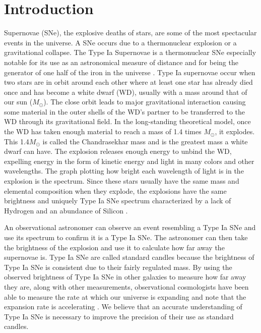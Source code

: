 \documentclass[preprint]{aastex62}
\begin{document}
\pagebreak

\section{Introduction}


  Supernovae (SNe), the explosive deaths of stars, are some of the most spectacular events in the universe. A SNe occurs due to a thermonuclear explosion or a gravitational collapse. The Type Ia Supernovae is a thermonuclear SNe especially notable for its use as an astronomical measure of distance and for being the generator of one half of the iron in the universe \citep{ironhalfuniverse}. Type Ia supernovae occur when two stars are in orbit around each other where at least one star has already died once and has become a white dwarf (WD), usually with a mass around that of our sun ($M_{\odot}$). The close orbit leads to major gravitational interaction causing some material in the outer shells of the WD's partner to be transferred to the WD through its gravitational field. In the long-standing theoretical model, once the WD has taken enough material to reach a mass of 1.4 times $M_{\odot}$, it explodes. This 1.4$M_{\odot}$ is called the Chandrasekhar mass and is the greatest mass a white dwarf can have. The explosion releases enough energy to unbind the WD, expelling energy in the form of kinetic energy and light in many colors and other wavelengths. The graph plotting how bright each wavelength of light is in the explosion is the spectrum. Since these stars usually have the same mass and elemental composition when they explode, the explosions have the same brightness and uniquely Type Ia SNe spectrum characterized by a lack of Hydrogen and an abundance of Silicon \citep{SNeSpectra}. 
  
  An observational astronomer can observe an event resembling a Type Ia SNe and use its spectrum to confirm it is a Type Ia SNe. The astronomer can then take the brightness of the explosion and use it to calculate how far away the supernovae is. Type Ia SNe are called standard candles because the brightness of Type Ia SNe is consistent due to their fairly regulated mass. By using the observed brightness of Type Ia SNe in other galaxies to measure how far away they are, along with other measurements, observational cosmologists have been able to measure the rate at which our universe is expanding and note that the expansion rate is accelerating \citep{acceleratingUniverse1, acceleratingUniverse2}. We believe that an accurate understanding of Type Ia SNe is necessary to improve the precision of their use as standard candles. 
  
\end{document}
